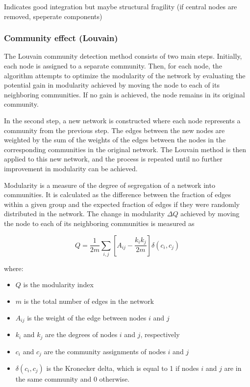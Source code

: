 Indicates good integration but maybe structural fragility (if central nodes are removed, speperate components)

\subsubsection{Community effect (Louvain)}

The Louvain community detection method consists of two main steps. Initially, each node is assigned to a separate community. Then, for each node, the algorithm attempts 
to optimize the modularity of the network by evaluating the potential gain in modularity achieved by 
moving the node to each of its neighboring communities. If no gain is achieved, the node remains in 
its original community.

In the second step, a new network is constructed where each node represents a community from the 
previous step. The edges between the new nodes are weighted by the sum of the weights of the edges 
between the nodes in the corresponding communities in the original network. The Louvain method is then 
applied to this new network, and the process is repeated until no further improvement in modularity 
can be achieved.

Modularity is a measure of the degree of segregation of a network into communities. It is calculated 
as the difference between the fraction of edges within a given group and the expected fraction of 
edges if they were randomly distributed in the network. The change in modularity $\Delta Q$ achieved 
by moving the node to each of its neighboring communities is measured as

$$
Q = \frac{1}{2m}\sum_{i,j}[A_{ij} - \frac{k_ik_j}{2m}]\delta(c_i,c_j)
$$

where:
\begin{itemize}
    \item $Q$ is the modularity index
    \item $m$ is the total number of edges in the network
    \item $A_{ij}$ is the weight of the edge between nodes $i$ and $j$
    \item $k_i$ and $k_j$ are the degrees of nodes $i$ and $j$, respectively
    \item $c_i$ and $c_j$ are the community assignments of nodes $i$ and $j$
    \item $\delta(c_i,c_j)$ is the Kronecker delta, which is equal to 1 if nodes $i$ and $j$ are in the same community and 0 otherwise.
\end{itemize}

